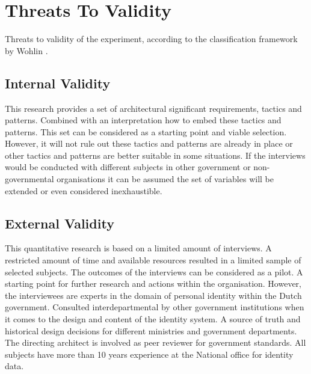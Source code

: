 \chapter{Threats To Validity}\label{sec:threats}
Threats to validity of the experiment, according to the classification framework by Wohlin \etal \cite{wohlin12}.

\section{Internal Validity}
This research provides a set of architectural significant requirements, tactics and patterns. Combined with an interpretation how to embed these tactics and patterns.
This set can be considered as a starting point and viable selection. However, it will not rule out these tactics and patterns are already in place or other tactics and patterns are better suitable in some situations. If the interviews would be conducted with different subjects in other government or non-governmental organisations it can be assumed the set of variables will be extended or even considered inexhaustible.

\section{External Validity}
This quantitative research is based on a limited amount of interviews. A restricted amount of time and available resources resulted in a limited sample of selected subjects. The outcomes of the interviews can be considered as a pilot. A starting point for further research and actions within the organisation. 
However, the interviewees are experts in the domain of personal identity within the Dutch government. Consulted interdepartmental by other government institutions when it comes to the design and content of the identity system. A source of truth and historical design decisions for different ministries and government departments. The directing architect is involved as peer reviewer for government standards. All subjects have more than 10 years experience at the National office for identity data.  

